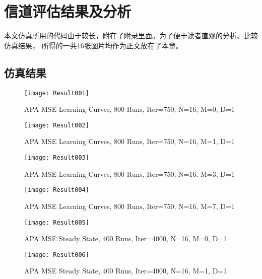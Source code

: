 \chapter{信道评估结果及分析}
本文仿真所用的代码由于较长，附在了附录里面。为了便于读者直观的分析、比较仿真结果，
所得的一共16张图片均作为正文放在了本章。
\section{仿真结果}
\begin{figure}[htbp]
  \texttt{[image: Result001]}\\
  \caption{APA MSE Learning Curves, 800 Runs, Iter=750, N=16, M=0, D=1}\label{APAMSE001}
\end{figure}

\begin{figure}[htbp]
  \texttt{[image: Result002]}\\
  \caption{APA MSE Learning Curves, 800 Runs, Iter=750, N=16, M=1, D=1}\label{APAMSE002}
\end{figure}

\begin{figure}[htbp]
  \texttt{[image: Result003]}\\
  \caption{APA MSE Learning Curves, 800 Runs, Iter=750, N=16, M=3, D=1}\label{APAMSE003}
\end{figure}

\begin{figure}[htbp]
  \texttt{[image: Result004]}\\
  \caption{APA MSE Learning Curves, 800 Runs, Iter=750, N=16, M=7, D=1}\label{APAMSE004}
\end{figure}

\begin{figure}[htbp]
  \texttt{[image: Result005]}\\
  \caption{APA MSE Steady State, 400 Runs, Iter=4000, N=16, M=0, D=1}\label{APAMSE005}
\end{figure}

\begin{figure}[htbp]
  \texttt{[image: Result006]}\\
  \caption{APA MSE Steady State, 400 Runs, Iter=4000, N=16, M=1, D=1}\label{APAMSE006}
\end{figure}

